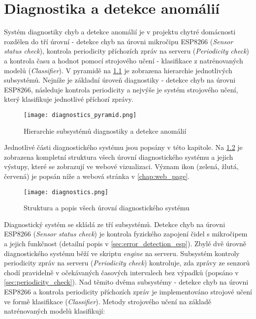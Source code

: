 \chapter{Diagnostika a detekce anomálií} \label{chap:diagnostics}
Systém diagnostiky chyb a detekce anomálií je v projektu chytré domácnosti rozdělen do tří úrovní - detekce chyb na úrovni mikročipu ESP8266 (\textit{Sensor status check}), kontrola periodicity příchozích zpráv na serveru (\textit{Periodicity check}) a kontrola času a hodnot pomocí strojového učení - klasifikace z natrénovaných modelů (\textit{Classifier}). V pyramidě na \cref{fig:diagnostics_pyramid} je zobrazena hierarchie jednotlivých subsystémů. Nejníže je základní úroveň diagnostiky - detekce chyb na úrovni ESP8266, následuje kontrola periodicity a nejvýše je systém strojového učení, který klasifikuje jednotlivé příchozí zprávy.  

\begin{figure}[H]
  \centering
  \texttt{[image: diagnostics\_pyramid.png]}
  \caption{Hierarchie subsystémů diagnostiky a detekce anomálií}
  \label{fig:diagnostics_pyramid}
\end{figure}  

Jednotlivé části diagnostického systému jsou popsány v této kapitole. Na \cref{fig:diagnostics} je zobrazena kompletní struktura všech úrovní diagnostického systému a jejich výstupy, které se zobrazují ve webové vizualizaci. Význam ikon (zelená, žlutá, červená) je popsán níže a webová stránka v \cref{chap:web_page}. 

\begin{figure}[H]
  \centering
  \texttt{[image: diagnostics.png]}
  \caption{Struktura a popis všech úrovní diagnostického systému}
  \label{fig:diagnostics}
\end{figure}  

Diagnostický systém se skládá ze tří subsystémů. Detekce chyb na úrovni ESP8266 (\textit{Sensor status check}) je kontrola fyzického zapojení čidel s mikročipem a jejich funkčnost (detailní popis v \cref{sec:error_detection_esp}). Zbylé dvě úrovně diagnostického systému běží ve skriptu \textit{engine} na serveru. Subsystém kontroly periodicity zpráv na serveru (\textit{Periodicity check}) kontroluje, zda zprávy ze senzorů chodí pravidelně v očekávaných časových intervalech bez výpadků (popsáno v \cref{sec:periodicity_check}). Nad těmito dvěma subsystémy - detekce chyb na úrovni ESP8266 a kontrola periodicity příchozích zpráv je implementováno strojové učení ve formě klasifikace (\textit{Classifier}). Metody strojového učení na základě natrénovaných modelů klasifikují:

